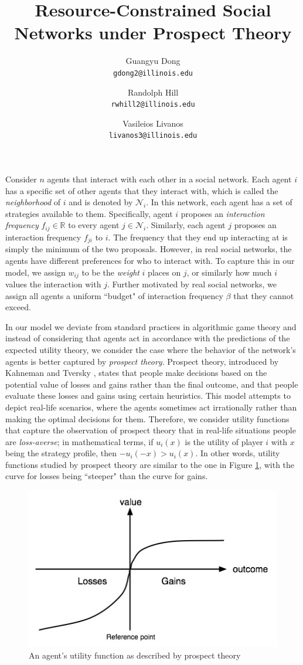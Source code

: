 \documentclass[A4paper,11pt]{article}
\author{
	{\sc Guangyu Dong} \\
	\texttt{gdong2@illinois.edu}
	\and
	{\sc Randolph Hill} \\
	\texttt{rwhill2@illinois.edu}
	\and
	{\sc Vasileios Livanos} \\
	\texttt{livanos3@illinois.edu}
}
\title{
Resource-Constrained Social Networks under Prospect Theory
}
\date{}
\begin{document}
 \maketitle

\par Consider $n$ agents that interact with each other in a social network. Each agent $i$ has a specific set of other agents
that they interact with, which is called the \textit{neighborhood} of $i$ and is denoted by $\mathcal{N}_i$. In this network,
each agent has a set of strategies available to them. Specifically, agent $i$ proposes an \textit{interaction frequency}
$f_{ij} \in \mathbb{R}$ to every agent $j \in \mathcal{N}_i$. Similarly, each agent $j$ proposes an
interaction frequency $f_{ji}$ to $i$. The frequency that they end up interacting at is simply the minimum of the two
proposals. However, in real social networks, the agents have different preferences for who to interact with. To capture this
in our model, we assign $w_{ij}$ to be the \textit{weight} $i$ places on $j$, or similarly how much $i$ values the interaction
with $j$. Further motivated by real social networks, we assign all agents a uniform ``budget" of interaction frequency $\beta$
that they cannot exceed.

\par In our model we deviate from standard practices in algorithmic game theory and instead of considering that agents act
in accordance with the predictions of the expected utility theory, we consider the case where the behavior of the network's
agents is better captured by \textit{prospect theory}. Prospect theory, introduced by Kahneman and Tversky \cite{KT}, states
that people make decisions based on the potential value of losses and gains rather than the final outcome, and that people
evaluate these losses and gains using certain heuristics. This model attempts to depict real-life scenarios, where the agents
sometimes act irrationally rather than making the optimal decisions for them. Therefore, we consider utility functions that
capture the observation of prospect theory that in real-life situations people are \textit{loss-averse}; in mathematical terms,
if $u_i(x)$ is the utility of player $i$ with $x$ being the strategy profile, then $- u_i(-x) > u_i(x)$. In other words, utility
functions studied by prospect theory are similar to the one in Figure \ref{fig:prospect-util}, with the curve for losses being
``steeper" than the curve for gains.

\begin{figure}[h!]
  \centering
  \includegraphics[width=.30\linewidth]{./Valuefun.jpg}
  \caption{An agent's utility function as described by prospect theory}
  \label{fig:prospect-util}
\end{figure}
\end{document}

